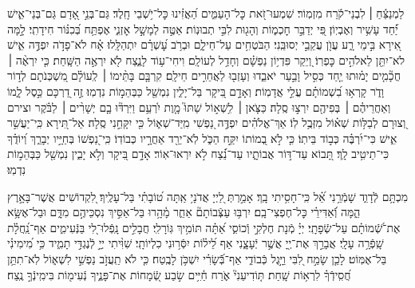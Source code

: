 \documentclass[twoside, openany, parskip=half, 11pt]{book}
\begin{document}
\begin{sometimes}

לַמְנַצֵּ֬חַ ׀ לִבְנֵי־קֹ֬רַח מִזְמֽוֹר׃
שִׁמְעוּ־זֹ֭את כׇּל־הָעַמִּ֑ים הַ֝אֲזִ֗ינוּ כׇּל־יֹ֥שְׁבֵי חָֽלֶד׃
גַּם־בְּנֵ֣י אָ֭דָם גַּם־בְּנֵי־אִ֑ישׁ יַ֗֝חַד עָשִׁ֥יר וְאֶבְיֽוֹן׃
פִּ֭י יְדַבֵּ֣ר חׇכְמ֑וֹת וְהָג֖וּת לִבִּ֣י תְבוּנֽוֹת׃
אַטֶּ֣ה לְמָשָׁ֣ל אׇזְנִ֑י אֶפְתַּ֥ח בְּ֝כִנּ֗וֹר חִידָתִֽי׃
לָ֣מָּה אִ֭ירָא בִּ֣ימֵי רָ֑ע עֲוֺ֖ן עֲקֵבַ֣י יְסוּבֵּֽנִי׃
הַבֹּטְחִ֥ים עַל־חֵילָ֑ם וּבְרֹ֥ב עׇ֝שְׁרָ֗ם יִתְהַלָּֽלוּ׃
אָ֗ח לֹא־פָדֹ֣ה יִפְדֶּ֣ה אִ֑ישׁ לֹא־יִתֵּ֖ן לֵאלֹהִ֣ים כׇּפְרֽוֹ׃
וְ֭יֵקַר פִּדְי֥וֹן נַפְשָׁ֗ם וְחָדַ֥ל לְעוֹלָֽם׃
וִיחִי־ע֥וֹד לָנֶ֑צַח לֹ֖א יִרְאֶ֣ה הַשָּֽׁחַת׃
כִּ֤י יִרְאֶ֨ה ׀ חֲכָ֘מִ֤ים יָמ֗וּתוּ יַ֤חַד כְּסִ֣יל וָבַ֣עַר יֹאבֵ֑דוּ וְעָזְב֖וּ לַאֲחֵרִ֣ים חֵילָֽם׃
קִרְבָּ֤ם בָּתֵּ֨ימוֹ ׀ לְֽעוֹלָ֗ם מִ֭שְׁכְּנֹתָם לְד֣וֹר וָדֹ֑ר קָרְא֥וּ בִ֝שְׁמוֹתָ֗ם עֲלֵ֣י אֲדָמֽוֹת׃
וְאָדָ֣ם בִּ֭יקָר בַּל־יָלִ֑ין נִמְשַׁ֖ל כַּבְּהֵמ֣וֹת נִדְמֽוּ׃
זֶ֣ה דַ֭רְכָּם כֵּ֣סֶל לָ֑מוֹ וְאַחֲרֵיהֶ֓ם ׀ בְּפִיהֶ֖ם יִרְצ֣וּ סֶֽלָה׃
כַּצֹּ֤אן ׀ לִ֥שְׁא֣וֹל שַׁתּוּ֮ מָ֤וֶת יִ֫רְעֵ֥ם וַיִּרְדּ֘וּ בָ֤ם יְשָׁרִ֨ים ׀ לַבֹּ֗קֶר וצירם וְ֭צוּרָם לְבַלּ֥וֹת שְׁא֗וֹל מִזְּבֻ֥ל לֽוֹ׃
אַךְ־אֱלֹהִ֗ים יִפְדֶּ֣ה נַ֭פְשִׁי מִֽיַּד־שְׁא֑וֹל כִּ֖י יִקָּחֵ֣נִי סֶֽלָה׃
אַל־תִּ֭ירָא כִּֽי־יַעֲשִׁ֣ר אִ֑ישׁ כִּי־יִ֝רְבֶּ֗ה כְּב֣וֹד בֵּיתֽוֹ׃
כִּ֤י לֹ֣א בְ֭מוֹתוֹ יִקַּ֣ח הַכֹּ֑ל לֹֽא־יֵרֵ֖ד אַחֲרָ֣יו כְּבוֹדֽוֹ׃
כִּֽי־נַ֭פְשׁוֹ בְּחַיָּ֣יו יְבָרֵ֑ךְ וְ֝יוֹדֻ֗ךָ כִּי־תֵיטִ֥יב לָֽךְ׃
תָּ֭בוֹא עַד־דּ֣וֹר אֲבוֹתָ֑יו עַד־נֵ֗֝צַח לֹ֣א יִרְאוּ־אֽוֹר׃
אָדָ֣ם בִּ֭יקָר וְלֹ֣א יָבִ֑ין נִמְשַׁ֖ל כַּבְּהֵמ֣וֹת נִדְמֽוּ׃ 

\sepline

%
מִכְתָּ֥ם לְֿדָוִ֑ד שָׁמְֿרֵ֥נִי אֵ֝֗ל כִּֽי־חָסִ֥יתִי בָֽךְ׃ אָמַ֣רְתְּ לַ֭יְיָ אֲדֹנָי֥ אַֽתָּה ט֝וֹבָתִ֗י בַּל־עָלֶֽיךָ׃ לִ֭קְדוֹשִׁים אֲשֶׁר־בָּאָ֣רֶץ הֵ֑מָּה וְֿ֝אַדִּירֵ֗י כׇּל־חֶפְצִי־בָֽם׃ יִרְבּ֥וּ עַצְּֿבוֹתָם֘ אַחֵ֢ר מָ֫הָ֥רוּ בַּל־אַסִּ֣יךְ נִסְכֵּיהֶ֣ם מִדָּ֑ם וּבַל־אֶשָּׂ֥א אֶת־שְֿׁ֝מוֹתָ֗ם עַל־שְֿׂפָתָֽי׃ יְיָ֗ מְֿנָת חֶלְקִ֣י וְֿכוֹסִ֑י אַ֝תָּ֗ה תּוֹמִ֥יךְ גּֽוֹרָלִֽי׃ חֲבָלִ֣ים נָֽפְֿלוּ־לִ֭י בַּנְּֿעִימִ֑ים אַף־נַֽ֝חֲלָ֗ת שָֽׁפְֿרָ֥ה עָלָֽי׃ אֲבָרֵ֣ךְ אֶת־יְ֖יָ אֲשֶׁ֣ר יְֿעָצָ֑נִי אַף לֵ֝יל֗וֹת יִסְּֿר֥וּנִי כִלְיוֹתָֽי׃ שִׁוִּ֨יתִי יְיָ֣ לְֿנֶגְדִּ֣י תָמִ֑יד כִּ֥י מִ֝ימִינִ֗י בַּל־אֶמּֽוֹט׃ לָכֵ֤ן שָׂמַ֣ח לִ֭בִּי וַיָּ֣גֶל כְּֿבוֹדִ֑י אַף־בְּֿֿ֝שָׂרִ֗י יִשְׁכֹּ֥ן לָבֶֽטַח׃ כִּ֤י לֹא תַֽעֲזֹ֣ב נַפְשִׁ֣י לִשְׁא֑וֹל לֹֽא־תִתֵּ֥ן חֲ֝סִֽידְֿךָ֗ לִרְא֥וֹת שָֽׁחַת׃ תּ֤וֹדִיעֵנִי֘ אֹ֢רַח חַ֫יִּ֥ים שׂ֣בַע שְֿׂ֭מָחוֹת אֶת־פָּנֶ֑יךָ נְֿעִימ֖וֹת בִּימִֽינְֿךָ֣ נֶֽצַח׃
\end{sometimes}
\end{document}
